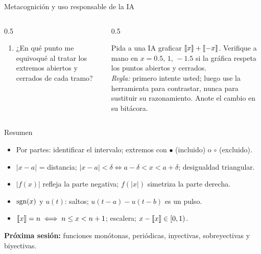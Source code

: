 \documentclass[10pt,aspectratio=169]{beamer}
\begin{document}
\begin{frame}{Metacognición y uso responsable de la IA}
  \small
  \begin{columns}[t]
    \begin{column}{0.5\textwidth}
      \begin{metacog}
        \begin{enumerate}
          \metacomun
          \item ¿En qué punto me equivoqué al tratar los extremos abiertos y cerrados de cada tramo?
        \end{enumerate}
      \end{metacog}
    \end{column}
    \begin{column}{0.5\textwidth}
      \begin{iabox}
        Pida a una IA graficar $\left\llbracket x\right\rrbracket+\left\llbracket -x\right\rrbracket$. Verifique a mano en $x=0.5,\,1,\,-1.5$ si la gráfica respeta los puntos abiertos y cerrados.\\[2pt]
        \textit{Regla:} primero intente usted; luego use la herramienta para contrastar, nunca para sustituir su razonamiento. Anote el cambio en su bitácora.
      \end{iabox}
    \end{column}
  \end{columns}
\end{frame}

\begin{frame}{Resumen}
  \begin{itemize}
    \item Por partes: identificar el intervalo; extremos con $\bullet$ (incluido) o $\circ$ (excluido).
    \item $|x-a|$ = distancia; $|x-a|<\delta\iff a-\delta<x<a+\delta$; desigualdad triangular.
    \item $|f(x)|$ refleja la parte negativa; $f(|x|)$ simetriza la parte derecha.
    \item $\operatorname{sgn}(x)$ y $u(t)$: saltos; $u(t-a)-u(t-b)$ es un pulso.
    \item $\left\llbracket x\right\rrbracket=n\iff n\le x<n+1$; escalera; $x-\left\llbracket x\right\rrbracket\in[0,1)$.
  \end{itemize}
  \vspace{3mm}
  \textbf{Próxima sesión:} funciones monótonas, periódicas, inyectivas, sobreyectivas y biyectivas.
\end{frame}
\end{document}
